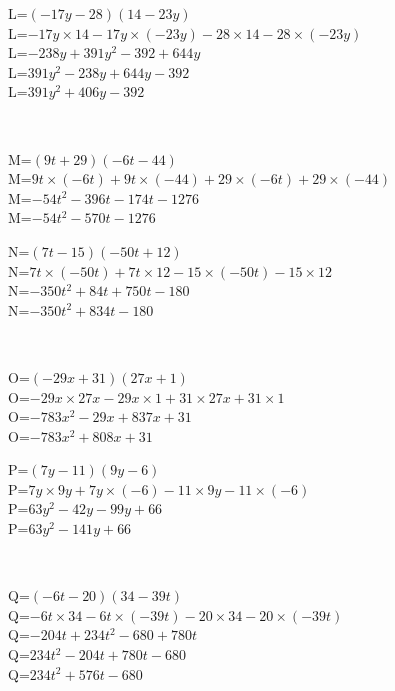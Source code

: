 \documentclass{article}%
\begin{document}
\begin{minipage}{0.5\textwidth}%
L=$(-17y-28)(14-23y)$\\%
L=$-17y \times 14-17y \times (-23y)-28 \times 14-28 \times (-23y)$\\%
L=$-238y+391y^2-392+644y$\\%
L=$391y^2-238y+644y-392$\\%
L=$391y^2+406y-392$\\%
\end{minipage}%
\\%
\begin{minipage}{0.5\textwidth}%
M=$(9t+29)(-6t-44)$\\%
M=$9t \times (-6t)+9t \times (-44)+29 \times (-6t)+29 \times (-44)$\\%
M=$-54t^2-396t-174t-1276$\\%
M=$-54t^2-570t-1276$\\%
\end{minipage}%
\begin{minipage}{0.5\textwidth}%
N=$(7t-15)(-50t+12)$\\%
N=$7t \times (-50t)+7t \times 12-15 \times (-50t)-15 \times 12$\\%
N=$-350t^2+84t+750t-180$\\%
N=$-350t^2+834t-180$\\%
\end{minipage}%
\\%
\begin{minipage}{0.5\textwidth}%
O=$(-29x+31)(27x+1)$\\%
O=$-29x \times 27x-29x \times 1+31 \times 27x+31 \times 1$\\%
O=$-783x^2-29x+837x+31$\\%
O=$-783x^2+808x+31$\\%
\end{minipage}%
\begin{minipage}{0.5\textwidth}%
P=$(7y-11)(9y-6)$\\%
P=$7y \times 9y+7y \times (-6)-11 \times 9y-11 \times (-6)$\\%
P=$63y^2-42y-99y+66$\\%
P=$63y^2-141y+66$\\%
\end{minipage}%
\\%
\begin{minipage}{0.5\textwidth}%
Q=$(-6t-20)(34-39t)$\\%
Q=$-6t \times 34-6t \times (-39t)-20 \times 34-20 \times (-39t)$\\%
Q=$-204t+234t^2-680+780t$\\%
Q=$234t^2-204t+780t-680$\\%
Q=$234t^2+576t-680$\\%
\end{minipage}%
\end{document}
